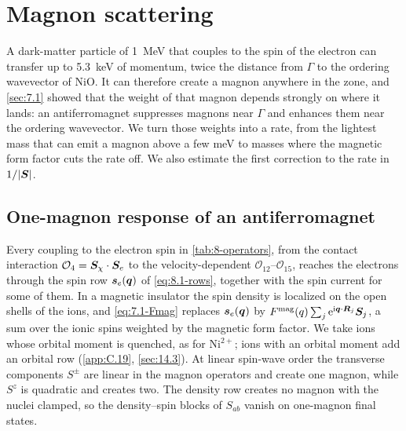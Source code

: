 \section{Magnon scattering}\label{sec:14.1}

A dark-matter particle of \SI{1}{MeV} that couples to the spin of the electron can transfer up to \SI{5.3}{keV} of momentum, twice the distance from $\Gamma$ to the ordering wavevector of NiO. It can therefore create a magnon anywhere in the zone, and \cref{sec:7.1} showed that the weight of that magnon depends strongly on where it lands: an antiferromagnet suppresses magnons near $\Gamma$ and enhances them near the ordering wavevector. We turn those weights into a rate, from the lightest mass that can emit a magnon above a few meV to masses where the magnetic form factor cuts the rate off. We also estimate the first correction to the rate in $1/|\bm{S}|$.

\subsection{One-magnon response of an antiferromagnet}

Every coupling to the electron spin in \cref{tab:8-operators}, from the contact interaction $\mathcal{O}_4 = \bm{S}_\chi\cdot\bm{S}_e$ to the velocity-dependent $\mathcal{O}_{12}$--$\mathcal{O}_{15}$, reaches the electrons through the spin row $\bm{s}_e(\bm{q})$ of \cref{eq:8.1-rows}, together with the spin current for some of them. In a magnetic insulator the spin density is localized on the open shells of the ions, and \cref{eq:7.1-Fmag} replaces $\bm{s}_e(\bm{q})$ by $F^{\mathrm{mag}}(q)\sum_j\mathrm{e}^{\mathrm{i}\bm{q}\cdot\bm{R}_j}\bm{S}_j$, a sum over the ionic spins weighted by the magnetic form factor. We take ions whose orbital moment is quenched, as for Ni$^{2+}$; ions with an orbital moment add an orbital row (\cref{app:C.19}, \cref{sec:14.3}). At linear spin-wave order the transverse components $S^\pm$ are linear in the magnon operators and create one magnon, while $S^z$ is quadratic and creates two. The density row creates no magnon with the nuclei clamped, so the density--spin blocks of $S_{ab}$ vanish on one-magnon final states.

